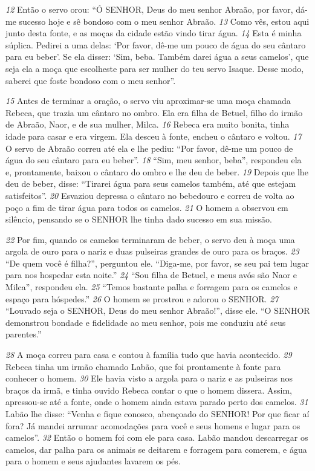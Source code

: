 \bigskip
\textit{\tiny 12}
Então o servo orou: “Ó SENHOR, Deus do meu senhor Abraão, por favor, dá-me
sucesso hoje e sê bondoso com o meu senhor Abraão. 
\textit{\tiny 13}
Como vês, estou aqui
junto desta fonte, e as moças da cidade estão vindo tirar água. 
\textit{\tiny 14}
Esta é minha
súplica. Pedirei a uma delas: ‘Por favor, dê-me um pouco de água do seu cântaro
para eu beber’. Se ela disser: ‘Sim, beba. Também darei água a seus camelos’, que
seja ela a moça que escolheste para ser mulher do teu servo Isaque. Desse modo,
saberei que foste bondoso com o meu senhor”.

\bigskip
\textit{\tiny 15}
Antes de terminar a oração, o servo viu aproximar-se uma moça chamada
Rebeca, que trazia um cântaro no ombro. Ela era filha de Betuel, filho do irmão de
Abraão, Naor, e de sua mulher, Milca. 
\textit{\tiny 16}
Rebeca era muito bonita, tinha idade para
casar e era virgem. Ela desceu à fonte, encheu o cântaro e voltou. 
\textit{\tiny 17}
O servo de
Abraão correu até ela e lhe pediu: “Por favor, dê-me um pouco de água do seu
cântaro para eu beber”.
\textit{\tiny 18}
“Sim, meu senhor, beba”, respondeu ela e, prontamente, baixou o cântaro do
ombro e lhe deu de beber. 
\textit{\tiny 19}
Depois que lhe deu de beber, disse: “Tirarei água
para seus camelos também, até que estejam satisfeitos”. 
\textit{\tiny 20}
Esvaziou depressa o
cântaro no bebedouro e correu de volta ao poço a fim de tirar água para todos os
camelos.
\textit{\tiny 21}
O homem a observou em silêncio, pensando se o SENHOR lhe tinha dado
sucesso em sua missão. 

\bigskip
\textit{\tiny 22}
Por fim, quando os camelos terminaram de beber, o
servo deu à moça uma argola de ouro para o nariz e duas pulseiras grandes de
ouro para os braços.
\textit{\tiny 23}
“De quem você é filha?”, perguntou ele. “Diga-me, por favor, se seu pai tem
lugar para nos hospedar esta noite.”
\textit{\tiny 24}
“Sou filha de Betuel, e meus avós são Naor e Milca”, respondeu ela. 
\textit{\tiny 25}
“Temos
bastante palha e forragem para os camelos e espaço para hóspedes.”
\textit{\tiny 26}
O homem se prostrou e adorou o SENHOR. 
\textit{\tiny 27}
“Louvado seja o SENHOR, Deus do
meu senhor Abraão!”, disse ele. “O SENHOR demonstrou bondade e fidelidade ao
meu senhor, pois me conduziu até seus parentes.”
   
\bigskip
\textit{\tiny 28}
A moça correu para casa e contou à família tudo que havia acontecido.
\textit{\tiny 29}
Rebeca tinha um irmão chamado Labão, que foi prontamente à fonte para
conhecer o homem. 
\textit{\tiny 30}
Ele havia visto a argola para o nariz e as pulseiras nos
braços da irmã, e tinha ouvido Rebeca contar o que o homem dissera. Assim,
apressou-se até a fonte, onde o homem ainda estava parado perto dos camelos.
\textit{\tiny 31}
Labão lhe disse: “Venha e fique conosco, abençoado do SENHOR! Por que ficar aí
fora? Já mandei arrumar acomodações para você e seus homens e lugar para os
camelos”.
\textit{\tiny 32}
Então o homem foi com ele para casa. Labão mandou descarregar os
camelos, dar palha para os animais se deitarem e forragem para comerem, e água
para o homem e seus ajudantes lavarem os pés. 

